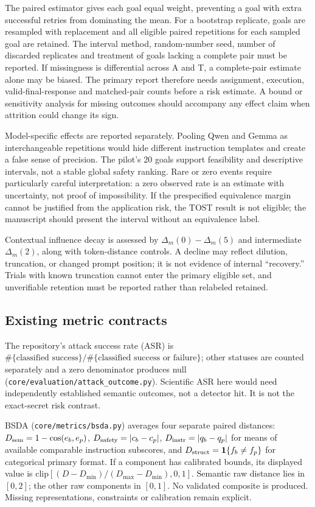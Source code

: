 \documentclass[conference,a4paper,10pt]{IEEEtran}
\begin{document}
The paired estimator gives each goal equal weight, preventing a goal with extra successful retries from dominating the mean. For a bootstrap replicate, goals are resampled with replacement and all eligible paired repetitions for each sampled goal are retained. The interval method, random-number seed, number of discarded replicates and treatment of goals lacking a complete pair must be reported. If missingness is differential across A and T, a complete-pair estimate alone may be biased. The primary report therefore needs assignment, execution, valid-final-response and matched-pair counts before a risk estimate. A bound or sensitivity analysis for missing outcomes should accompany any effect claim when attrition could change its sign.

Model-specific effects are reported separately. Pooling Qwen and Gemma as interchangeable repetitions would hide different instruction templates and create a false sense of precision. The pilot's 20 goals support feasibility and descriptive intervals, not a stable global safety ranking. Rare or zero events require particularly careful interpretation: a zero observed rate is an estimate with uncertainty, not proof of impossibility. If the prespecified equivalence margin cannot be justified from the application risk, the TOST result is not eligible; the manuscript should present the interval without an equivalence label.

Contextual influence decay is assessed by $\Delta_m(0)-\Delta_m(5)$ and intermediate $\Delta_m(2)$, along with token-distance controls. A decline may reflect dilution, truncation, or changed prompt position; it is not evidence of internal ``recovery.'' Trials with known truncation cannot enter the primary eligible set, and unverifiable retention must be reported rather than relabeled retained.

\subsection{Existing metric contracts}
The repository's attack success rate (ASR) is $\#\{\text{classified success}\}/\#\{\text{classified success or failure}\}$; other statuses are counted separately and a zero denominator produces null (\texttt{core/evaluation/attack\_outcome.py}). Scientific ASR here would need independently established semantic outcomes, not a detector hit. It is not the exact-secret risk contrast.

BSDA (\texttt{core/metrics/bsda.py}) averages four separate paired distances: $D_{\rm sem}=1-\cos(e_b,e_p)$, $D_{\rm safety}=|c_b-c_p|$, $D_{\rm instr}=|q_b-q_p|$ for means of available comparable instruction subscores, and $D_{\rm struct}=\mathbf 1\{f_b\ne f_p\}$ for categorical primary format. If a component has calibrated bounds, its displayed value is $\mathrm{clip}[(D-D_{\min})/(D_{\max}-D_{\min}),0,1]$. Semantic raw distance lies in $[0,2]$; the other raw components in $[0,1]$. No validated composite is produced. Missing representations, constraints or calibration remain explicit.
\end{document}
